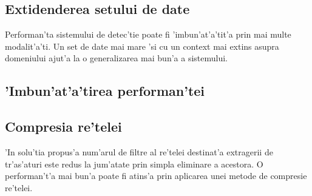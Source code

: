 \documentclass[12pt,a4paper,twoside]{report}
\begin{document}
\subsection{Extidenderea setului de date}
Performan'ta sistemului de detec'tie poate fi 'imbun'at'a'tit'a prin mai multe modalit'a'ti. Un set de date mai mare 'si cu un context mai extins asupra domeniului ajut'a la o generalizarea mai bun'a a sistemului. 

\subsection{'Imbun'at'a'tirea performan'tei}
\subsection{Compresia re'telei}
'In solu'tia propus'a num'arul de filtre al re'telei destinat'a extragerii de tr'as'aturi este redus la jum'atate prin simpla eliminare a acestora. O performan't'a mai bun'a poate fi atins'a prin aplicarea unei metode de compresie re'telei.

 


\end{document}
